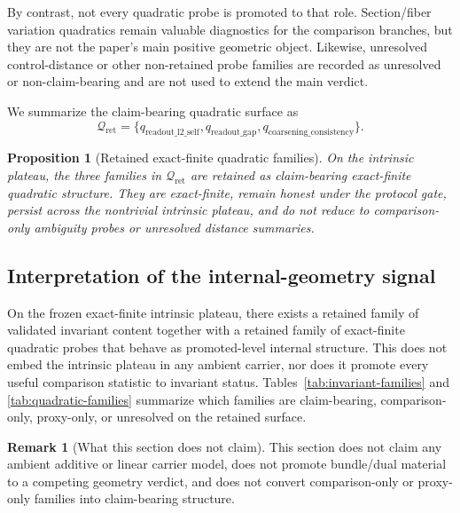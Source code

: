\documentclass[11pt]{article}
\newtheorem{proposition}[theorem]{Proposition}
\theoremstyle{definition}
\newtheorem{remark}[theorem]{Remark}
\begin{document}
By contrast, not every quadratic probe is promoted to that role. Section/fiber variation quadratics remain valuable diagnostics for the comparison branches, but they are not the paper's main positive geometric object. Likewise, unresolved control-distance or other non-retained probe families are recorded as unresolved or non-claim-bearing and are not used to extend the main verdict.

We summarize the claim-bearing quadratic surface as
\[
\mathcal Q_{\mathrm{ret}}
  =
  \{
    q_{\mathrm{readout\_l2\_self}},
    q_{\mathrm{readout\_gap}},
    q_{\mathrm{coarsening\_consistency}}
  \}.
\]

\begin{proposition}[Retained exact-finite quadratic families]
\label{prop:retained-quadratics}
On the intrinsic plateau, the three families in $\mathcal Q_{\mathrm{ret}}$ are retained as claim-bearing exact-finite quadratic structure. They are exact-finite, remain honest under the protocol gate, persist across the nontrivial intrinsic plateau, and do not reduce to comparison-only ambiguity probes or unresolved distance summaries.
\end{proposition}

\subsection{Interpretation of the internal-geometry signal}

On the frozen exact-finite intrinsic plateau, there exists a retained family of validated invariant content together with a retained family of exact-finite quadratic probes that behave as promoted-level internal structure. This does not embed the intrinsic plateau in any ambient carrier, nor does it promote every useful comparison statistic to invariant status. Tables~\ref{tab:invariant-families} and \ref{tab:quadratic-families} summarize which families are claim-bearing, comparison-only, proxy-only, or unresolved on the retained surface.

\begin{remark}[What this section does not claim]
\label{rem:no-global-linearity}
This section does not claim any ambient additive or linear carrier model, does not promote bundle/dual material to a competing geometry verdict, and does not convert comparison-only or proxy-only families into claim-bearing structure.
\end{remark}
\end{document}
